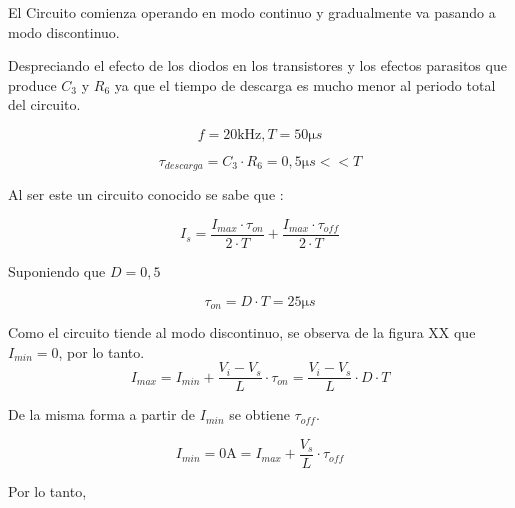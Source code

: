 
El Circuito comienza operando en modo continuo y gradualmente va pasando a modo discontinuo.


Despreciando el efecto de los diodos en los transistores y los efectos parasitos que produce $C_3$ y $R_6$ ya que el tiempo de descarga es mucho menor al periodo total del circuito. 

\begin{equation}
	f = 20 \si{\kilo\Hz} , T = 50 \si{\micro}s 
\end{equation}

\begin{equation}
	\si{\tau}_{descarga} = C_3 \cdot R_6 = 0,5 \si{\micro}s << T
\end{equation}

Al ser este un circuito conocido se sabe que :

\begin{equation}
 	I_s = \frac{{I_{max} \cdot \si{\tau}_{on}}}{{2 \cdot T}} + \frac{{I_{max} \cdot \si{\tau}_{off}}}{{2 \cdot T}}
 	\label{ec:Is}
\end{equation}

 Suponiendo que $D= 0,5$

\begin{equation}
	\si{\tau}_{on} = D \cdot T = 25\si{\micro}s 
\end{equation}

Como el circuito tiende al modo discontinuo, se observa de la figura XX que $I_{min} = 0$, por lo tanto.
\begin{equation}
 	I_{max} = I_{min} + \frac{{V_{i} - V_{s}}}{L} \cdot \si{\tau}_{on} = \frac{{V_{i} - V_{s}}}{L} \cdot D \cdot T
\end{equation}

De la misma forma a partir de $I_{min}$ se obtiene $\si{\tau}_{off}$.

\begin{equation}
 	I_{min} = 0 \si{\ampere} =  I_{max} + \frac{V_{s} }{L} \cdot \si{\tau}_{off}  
\end{equation}


Por lo tanto,

